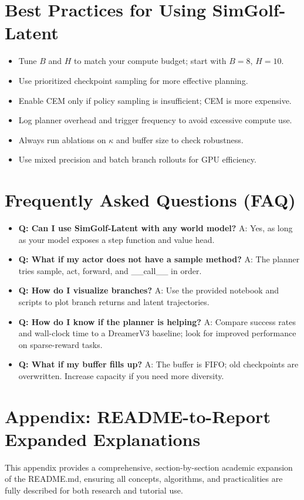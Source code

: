 \documentclass{article}
\begin{document}
\section{Best Practices for Using SimGolf-Latent}
\begin{itemize}
\item Tune $B$ and $H$ to match your compute budget; start with $B=8$, $H=10$.
\item Use prioritized checkpoint sampling for more effective planning.
\item Enable CEM only if policy sampling is insufficient; CEM is more expensive.
\item Log planner overhead and trigger frequency to avoid excessive compute use.
\item Always run ablations on $\kappa$ and buffer size to check robustness.
\item Use mixed precision and batch branch rollouts for GPU efficiency.
\end{itemize}

\section{Frequently Asked Questions (FAQ)}
\begin{itemize}
\item \textbf{Q: Can I use SimGolf-Latent with any world model?}
A: Yes, as long as your model exposes a step function and value head.
\item \textbf{Q: What if my actor does not have a sample method?}
A: The planner tries sample, act, forward, and __call__ in order.
\item \textbf{Q: How do I visualize branches?}
A: Use the provided notebook and scripts to plot branch returns and latent trajectories.
\item \textbf{Q: How do I know if the planner is helping?}
A: Compare success rates and wall-clock time to a DreamerV3 baseline; look for improved performance on sparse-reward tasks.
\item \textbf{Q: What if my buffer fills up?}
A: The buffer is FIFO; old checkpoints are overwritten. Increase capacity if you need more diversity.
\end{itemize}

\section{Appendix: README-to-Report Expanded Explanations}
This appendix provides a comprehensive, section-by-section academic expansion of the README.md, ensuring all concepts, algorithms, and practicalities are fully described for both research and tutorial use.
\end{document}
